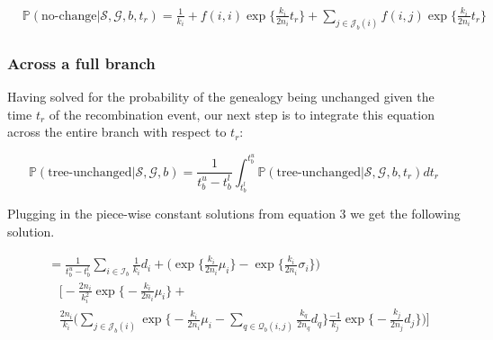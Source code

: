 \documentclass[11pt]{article}
\begin{document}

\begin{equation}\tag{3}
\begin{aligned}
	&\mathbb{P}(\text{no-change} | \mathcal{S},\mathcal{G},b,t_r) = 
	\frac{1}{k_i} + f(i,i) \exp \bigg\{\frac{k_i}{2n_i} t_r\bigg\} +
	\sum_{j \in \mathcal{J}_b(i)} f(i,j) \exp\bigg\{\frac{k_i}{2n_i}t_r\bigg\} 
\end{aligned}
\end{equation}



\subsubsection{Across a full branch}
Having solved for the probability of the genealogy being unchanged given the 
time $t_r$ of the recombination event, our next step is to integrate this equation
across the entire branch with respect to $t_r$:

\begin{equation}
	\mathbb{P}(\text{tree-unchanged} | \mathcal{S}, \mathcal{G}, b) = 
		\frac{1}{t_b^u - t_b^l} 
		\int_{t_b^l}^{t_b^u} 
		\mathbb{P}(\text{tree-unchanged} | \mathcal{S}, \mathcal{G}, b, t_r) dt_r
\end{equation}

\noindent Plugging in the piece-wise constant solutions from equation 3
we get the following solution.

\begin{equation}
\begin{aligned}
	&= \frac{1}{t^u_b-t^l_b}
	\sum_{i \in \mathcal{I}_b}
	\frac{1}{k_i}d_i + 
	\bigg(
		\exp \bigg\{ \frac{k_i}{2n_i} \mu_{i} \bigg\}
		-\exp \bigg\{ \frac{k_i}{2n_i} \sigma_i	\bigg\}
	\bigg)\\
	&~~~~\Bigg[
		-\frac{2n_i}{k_i^2}
		\exp \bigg\{ -\frac{k_i}{2n_i} \mu_{i} \bigg\} + 
		\\
		&~~~~\frac{2n_i}{k_i}
		\Bigg(
			\sum_{j \in \mathcal{J}_b(i)}
			\exp \bigg\{
				-\frac{k_i}{2n_i} \mu_{i} -
				\sum_{q \in \mathcal{Q}_b(i,j)}
				\frac{k_q}{2n_q} d_q
				\bigg\}
			\frac{-1}{k_j} \exp \bigg\{-\frac{k_j}{2n_j} d_j \bigg\}
		\Bigg)
	\Bigg]
\end{aligned}
\end{equation}
\end{document}
